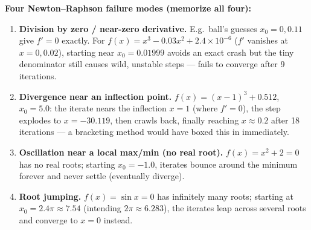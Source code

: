 \begin{keypoint}
\textbf{Four Newton--Raphson failure modes (memorize all four):}
\begin{enumerate}
\item \textbf{Division by zero / near-zero derivative.} E.g.\ ball's guesses $x_0=0,0.11$ give $f'=0$ exactly. For $f(x)=x^3-0.03x^2+2.4\times10^{-6}$ ($f'$ vanishes at $x=0,0.02$), starting near $x_0=0.01999$ avoids an exact crash but the tiny denominator still causes wild, unstable steps — fails to converge after 9 iterations.
\item \textbf{Divergence near an inflection point.} $f(x)=(x-1)^3+0.512$, $x_0=5.0$: the iterate nears the inflection $x=1$ (where $f'=0$), the step explodes to $x=-30.119$, then crawls back, finally reaching $x\approx0.2$ after 18 iterations — a bracketing method would have boxed this in immediately.
\item \textbf{Oscillation near a local max/min (no real root).} $f(x)=x^2+2=0$ has no real roots; starting $x_0=-1.0$, iterates bounce around the minimum forever and never settle (eventually diverge).
\item \textbf{Root jumping.} $f(x)=\sin x=0$ has infinitely many roots; starting at $x_0=2.4\pi\approx7.54$ (intending $2\pi\approx6.283$), the iterates leap across several roots and converge to $x=0$ instead.
\end{enumerate}
\end{keypoint}

